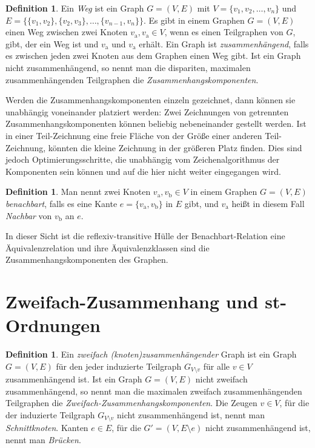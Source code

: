 \documentclass[a4paper]{scrreprt}
\theoremstyle{definition}
\newtheorem{definition}[satz]{Definition}
\begin{document}
\begin{definition}
  Ein \emph{Weg} ist ein Graph $G = (V, E)$ mit $V = \{v_1, v_2, \dots, v_n\}$ und $E = \{\{v_1, v_2\}, \{v_2, v_3\}, \dots, \{v_{n-1}, v_{n}\}\}$.
  Es gibt in einem Graphen $G = (V, E)$ einen Weg zwischen zwei Knoten $v_\text{a}, v_\text{a} \in V$, wenn es einen Teilgraphen von $G$, gibt, der ein Weg ist und $v_\text{a}$ und $v_\text{a}$ erhält.
  Ein Graph ist \emph{zusammenhängend}, falls es zwischen jeden zwei Knoten aus dem Graphen einen Weg gibt.
  Ist ein Graph nicht zusammenhängend, so nennt man die dispariten, maximalen zusammenhängenden Teilgraphen die \emph{Zusammenhangskomponenten}.
\end{definition}

Werden die Zusammenhangskomponenten einzeln gezeichnet, dann können sie unabhängig voneinander platziert werden: Zwei Zeichnungen von getrennten Zusammenhangskomponenten können beliebig nebeneinander gestellt werden. Ist in einer Teil-Zeichnung eine freie Fläche von der Größe einer anderen Teil-Zeichnung, könnten die kleine Zeichnung in der größeren Platz finden. Dies sind jedoch Optimierungsschritte, die unabhängig vom Zeichenalgorithmus der Komponenten sein können und auf die hier nicht weiter eingegangen wird.

\begin{definition}
  Man nennt zwei Knoten $v_\text{a}, v_\text{b} \in V$ in einem Graphen $G = (V, E)$ \emph{benachbart}, falls es eine Kante $e = \{v_\text{a}, v_\text{b}\}$ in $E$ gibt, und $v_\text{a}$ heißt in diesem Fall \emph{Nachbar} von $ v_\text{b}$ an $e$. 
\end{definition}

In dieser Sicht ist die reflexiv-transitive Hülle der Benachbart-Relation eine Äquivalenzrelation und ihre Äquivalenzklassen sind die Zusammenhangskomponenten des Graphen. %

\section{Zweifach-Zusammenhang und st-Ordnungen}

\begin{definition}
  Ein \emph{zweifach (knoten)zusammenhängender} Graph ist ein Graph $G=(V, E)$ für den jeder induzierte Teilgraph $G_{V \setminus v}$ für alle $v \in V$ zusammenhängend ist.
  Ist ein Graph $G=(V, E)$  nicht zweifach zusammenhängend, so nennt man die maximalen zweifach zusammenhängenden Teilgraphen die \emph{Zweifach-Zusammenhangskomponenten}. Die Zeugen $v \in V$, für die der induzierte Teilgraph $G_{V \setminus v}$ nicht zusammenhängend ist, nennt man \emph{Schnittknoten}. Kanten $e \in E$, für die $G' = (V, E \setminus e)$ nicht zusammenhängend ist, nennt man \emph{Brücken}.
\end{definition}
\end{document}
